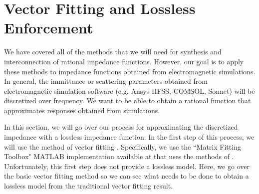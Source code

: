 

\section{Vector Fitting and Lossless Enforcement}\label{section:vector_fitting}
We have covered all of the methods that we will need for synthesis and interconnection of rational impedance functions. However, our goal is to apply these methods to impedance functions obtained from electromagnetic simulations. In general, the immittance or scattering parameters obtained from electromagnetic simulation software (e.g. Ansys HFSS, COMSOL, Sonnet) will be discretized over frequency. We want to be able to obtain a rational function that approximates responses obtained from simulations.

In this section, we will go over our process for approximating the discretized impedance with a lossless impedance function. In the first step of this process, we will use the method of vector fitting \cite{gustavsen_rational_1999}. Specifically, we use the ``Matrix Fitting Toolbox" MATLAB implementation available at \cite{matrix_fitting_toolbox} that uses the methods of \cite{gustavsen_rational_1999,gustavsen_improving_2006,deschrijver_macromodeling_2008}. Unfortunately, this first step does not provide a lossless model. Here, we go over the basic vector fitting method so we can see what needs to be done to obtain a lossless model from the traditional vector fitting result.

